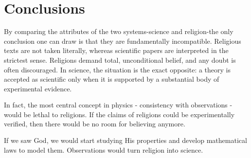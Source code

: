 \section{Conclusions}

By comparing the attributes of the two systems-science and religion-the only conclusion one can draw is that they are fundamentally incompatible.
Religious texts are not taken literally, whereas scientific papers are interpreted in the strictest sense.
Religions demand total, unconditional belief, and any doubt is often discouraged.
In science, the situation is the exact opposite: a theory is accepted as scientific only when it is supported by a substantial body of experimental evidence.

In fact, the most central concept in physics - consistency with observations - would be lethal to religions. 
If the claims of religions could be experimentally verified, then there would be no room for believing anymore.

If we saw God, we would start studying His properties and develop mathematical laws to model them.
Observations would turn religion into science.

